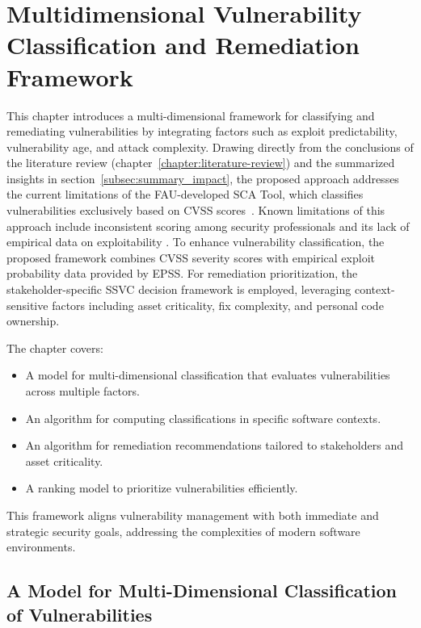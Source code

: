 \chapter{Multidimensional Vulnerability \\ Classification and Remediation Framework}
\label{chapter:multidimensional-vulnerability-classification}

This chapter introduces a multi-dimensional framework for classifying and remediating vulnerabilities by integrating factors such as exploit predictability, vulnerability age, and attack complexity. Drawing directly from the conclusions of the literature review (chapter~\ref{chapter:literature-review}) and the summarized insights in section~\ref{subsec:summary_impact}, the proposed approach addresses the current limitations of the \ac{FAU}-developed \ac{SCA} Tool, which classifies vulnerabilities exclusively based on \ac{CVSS} scores~\autocite{nehrke_webdienst_2023}. Known limitations of this approach include inconsistent scoring among security professionals and its lack of empirical data on exploitability \autocite{spring_time_2021, jacobs_exploit_2021}. To enhance vulnerability classification, the proposed framework combines \ac{CVSS} severity scores with empirical exploit probability data provided by \ac{EPSS}.
For remediation prioritization, the stakeholder-specific \ac{SSVC} decision framework is employed, leveraging context-sensitive factors including asset criticality, fix complexity, and personal code ownership.

The chapter covers:
\begin{itemize}
    \item A model for multi-dimensional classification that evaluates vulnerabilities across multiple factors.
    \item An algorithm for computing classifications in specific software contexts.
    \item An algorithm for remediation recommendations tailored to stakeholders and asset criticality.
    \item A ranking model to prioritize vulnerabilities efficiently.
\end{itemize}

This framework aligns vulnerability management with both immediate and strategic security goals, addressing the complexities of modern software environments.

\section{A Model for Multi-Dimensional Classification of Vulnerabilities}
\label{sec:multi-dimensional-classification}

